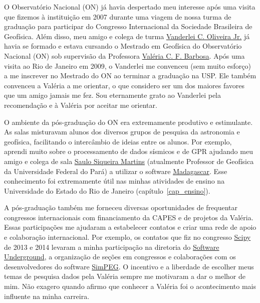\documentclass[12pt,a4paper,oneside]{book}
\newcommand{\ON}{Observatório Nacional}
\newcommand{\UERJ}{Universidade do Estado do Rio de Janeiro}
\begin{document}
O \ON{} (ON) já havia despertado meu interesse após uma visita
que fizemos à instituição em 2007 durante uma viagem de nossa turma de
graduação para participar do Congresso Internacional da Sociedade Brasileira de
Geofísica.
Além disso, meu amigo e colega de turma
\href{https://www.pinga-lab.org/people/oliveira-jr.html}{Vanderlei C. Oliveira Jr.}
já havia se formado e estava cursando o Mestrado em Geofísica do Observatório
Nacional (ON) sob supervisão da Professora
\href{https://www.pinga-lab.org/people/barbosa.html}{Valéria C. F. Barbosa}.
Após uma visita ao Rio de Janeiro em 2009, o Vanderlei me convenceu (sem muito
esforço) a me inscrever no Mestrado do ON ao terminar a graduação na USP.
Ele também convenceu a Valéria a me orientar, o que considero ser um dos
maiores favores que um amigo jamais me fez.
Sou eternamente grato ao Vanderlei pela recomendação e à Valéria por aceitar me
orientar.

O ambiente da pós-graduação do ON era extremamente produtivo e estimulante.
As salas misturavam alunos dos diversos grupos de pesquisa da astronomia e
geofísica, facilitando o intercâmbio de ideias entre os alunos.
Por exemplo, aprendi muito sobre o processamento de dados sísmicos e de GPR
ajudando meu amigo e colega de sala
\href{https://www.linkedin.com/in/saulo-siqueira-martins-78770878/}{Saulo Siqueira Martins}
(atualmente Professor de Geofísica da Universidade Federal do Pará)
a utilizar o software \href{https://www.reproducibility.org/}{Madagascar}.
Esse conhecimento foi extremamente útil nas minhas atividades de ensino na
\UERJ{} (capítulo~\ref{cap_ensino}).

A pós-graduação também me forneceu diversas oportunidades de frequentar
congressos internacionais com financiamento da CAPES e de projetos da Valéria.
Essas participações me ajudaram a estabelecer contatos e criar uma rede de
apoio e colaboração internacional.
Por exemplo, os contatos que fiz no congresso
\href{https://conference.scipy.org/scipy2014/}{Scipy} de 2013 e 2014 levaram a
minha participação na diretoria do
\href{https://softwareunderground.org/}{Software Underground}, a organização
de seções em congressos e colaborações com os desenvolvedores do software
\href{https://simpeg.xyz/}{SimPEG}.
O incentivo e a liberdade de escolher meus temas de pesquisa dados pela Valéria
sempre me motivaram a dar o melhor de mim.
Não exagero quando afirmo que conhecer a Valéria foi o acontecimento mais
influente na minha carreira.
\end{document}
